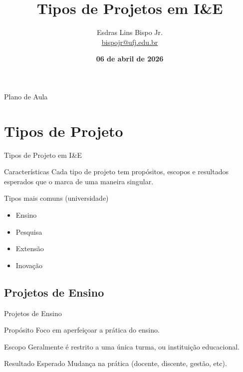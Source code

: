\documentclass[xcolor=dvipsnames,table]{beamer}
\title{Tipos de Projetos em I\&E}
\author{
  Esdras Lins Bispo Jr. \\ \url{bispojr@ufj.edu.br}
  }
\institute{
  Tópicos em Informática e Educação \\Bacharelado em Ciência da Computação}
\date{\textbf{06 de abril de 2026} }
\begin{document}
	\begin{frame}
		\titlepage
	\end{frame}

	\AtBeginSection{
		\begin{frame}{Sumário}%
    		\tableofcontents[currentsection]
		\end{frame}
	}

	\begin{frame}{Plano de Aula}
		\tableofcontents
	\end{frame}
	
	\section{Tipos de Projeto}

       \begin{frame}{Tipos de Projeto em I\&E}
           \begin{block}{Características}
               Cada tipo de projeto tem propósitos, escopos e resultados esperados que o marca de uma maneira singular.
           \end{block} \pause
           \begin{block}{Tipos mais comuns (universidade)}
               \begin{itemize}
                   \item Ensino
                   \item Pesquisa
                   \item Extensão
                   \item Inovação
               \end{itemize}
           \end{block}
       \end{frame}

       \subsection{Projetos de Ensino}

       \begin{frame}{Projetos de Ensino}
            \begin{block}{Propósito}
                Foco em aperfeiçoar a prática do ensino.
            \end{block} \pause
            \begin{block}{Escopo}
                Geralmente é restrito a uma única turma, ou instituição educacional.
            \end{block} \pause
            \begin{exampleblock}{Resultado Esperado}
                Mudança na prática (docente, discente, gestão, etc).
            \end{exampleblock}
           
       \end{frame}
\end{document}
